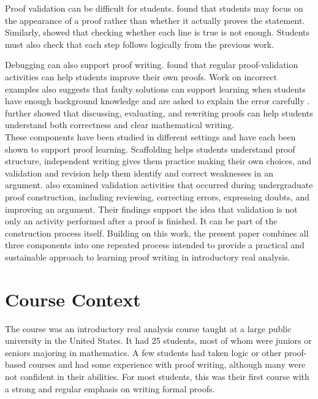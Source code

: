 \documentclass[12pt]{article}
\begin{document}
Proof validation can be difficult for students. \textcite{selden2003} found that students may focus on the appearance of a proof rather than whether it actually proves the statement. Similarly, \textcite{alcock2005} showed that checking whether each line is true is not enough. Students must also check that each step follows logically from the previous work.

Debugging can also support proof writing. \textcite{powers2010} found that regular proof-validation activities can help students improve their own proofs. Work on incorrect examples also suggests that faulty solutions can support learning when students have enough background knowledge and are asked to explain the error carefully \parencite{grosse2007}. \textcite{pi2024} further showed that discussing, evaluating, and rewriting proofs can help students understand both correctness and clear mathematical writing.
\\

These components have been studied in different settings and have each been shown to support proof learning. Scaffolding helps students understand proof structure, independent writing gives them practice making their own choices, and validation and revision help them identify and correct weaknesses in an argument. \textcite{kirsten2023} also examined validation activities that occurred during undergraduate proof construction, including reviewing, correcting errors, expressing
doubts, and improving an argument. Their findings support the idea that validation is not only an activity performed after a proof is finished. It can be part of the construction process
itself. Building on this work, the present paper combines all three components into one repeated process intended to provide a practical and sustainable approach to learning proof writing in introductory real analysis.

\section{Course Context}

The course was an introductory real analysis course taught at a large public university in the United States. It had 25 students, most of whom were juniors or seniors majoring in mathematics. A few students had taken logic or other proof-based courses and had some experience with proof writing, although many were not confident in their abilities. For most students, this was their first course with a strong and regular emphasis on writing formal proofs.
\end{document}
